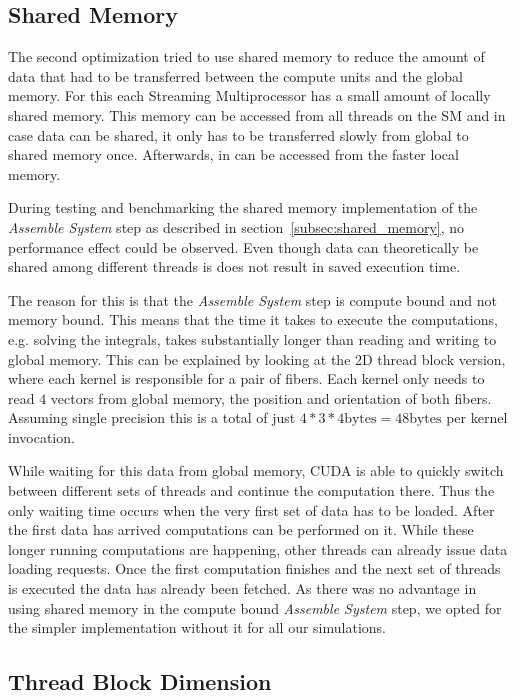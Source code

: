 \subsection{Shared Memory}
\label{subsec:bench_shared_memory}

The second optimization tried to use shared memory to reduce the amount of data that had to be transferred between the compute units and the global memory. For this each Streaming Multiprocessor has a small amount of locally shared memory. This memory can be accessed from all threads on the SM and in case data can be shared, it only has to be transferred slowly from global to shared memory once. Afterwards, in can be accessed from the faster local memory.

During testing and benchmarking the shared memory implementation of the \emph{Assemble System} step as described in section~\ref{subsec:shared_memory}, no performance effect could be observed. Even though data can theoretically be shared among different threads is does not result in saved execution time.

The reason for this is that the \emph{Assemble System} step is compute bound and not memory bound. This means that the time it takes to execute the computations, e.g. solving the integrals, takes substantially longer than reading and writing to global memory. This can be explained by looking at the 2D thread block version, where each kernel is responsible for a pair of fibers. Each kernel only needs to read $4$ vectors from global memory, the position and orientation of both fibers. Assuming single precision this is a total of just $4 * 3 * 4\text{bytes} = 48\text{bytes}$ per kernel invocation.

While waiting for this data from global memory, CUDA is able to quickly switch between different sets of threads and continue the computation there. Thus the only waiting time occurs when the very first set of data has to be loaded. After the first data has arrived computations can be performed on it. While these longer running computations are happening, other threads can already issue data loading requests. Once the first computation finishes and the next set of threads is executed the data has already been fetched. As there was no advantage in using shared memory in the compute bound \emph{Assemble System} step, we opted for the simpler implementation without it for all our simulations.

\subsection{Thread Block Dimension}

